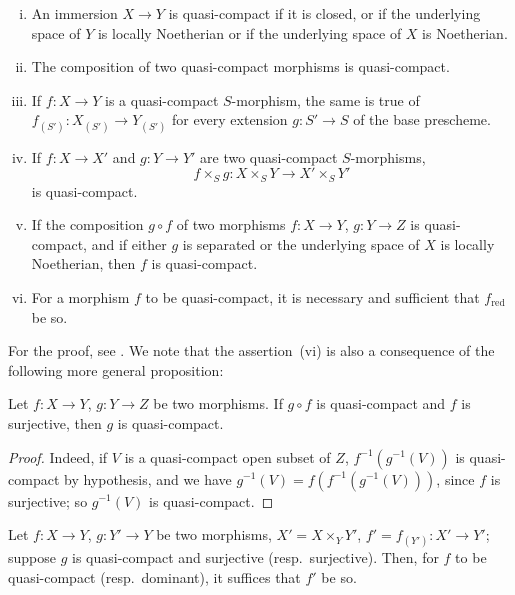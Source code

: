 \begin{proposition}[1.1.2]
\label{IV.1.1.2}
\medskip\noindent
\begin{enumerate}[(i)]
  \item An immersion $X\to Y$ is quasi-compact if it is closed,
    or if the underlying space of $Y$ is locally Noetherian or if the underlying space of $X$ is Noetherian.
  \item The composition of two quasi-compact morphisms is quasi-compact.
  \item If $f:X\to Y$ is a quasi-compact $S$-morphism, the same is true of $f_{(S')}:X_{(S')}\to Y_{(S')}$
    for every extension $g:S'\to S$ of the base prescheme.
  \item If $f:X\to X'$ and $g:Y\to Y'$ are two quasi-compact $S$-morphisms,
    \[
      f\times_S g: X\times_S Y \to X'\times_S Y'
    \]
    is quasi-compact.
  \item If the composition $g\circ f$ of two morphisms $f:X\to Y$, $g:Y\to Z$ is quasi-compact, and
    if either $g$ is separated or the underlying space of $X$ is locally Noetherian, then $f$ is quasi-compact.
  \item For a morphism $f$ to be quasi-compact, it is necessary and sufficient that $f_{\mathrm{red}}$ be so.
\end{enumerate}
\end{proposition}

For the proof, see .
We note that the assertion~(vi) is also a
consequence of the following more general proposition:

\begin{proposition}[1.1.3]
\label{IV.1.1.3}
Let $f:X\to Y$, $g:Y\to Z$ be two morphisms. If $g\circ f$ is quasi-compact and $f$ is surjective, then $g$ is quasi-compact.
\end{proposition}

\begin{proof}
Indeed, if $V$ is a quasi-compact open subset of $Z$, $f^{-1}(g^{-1}(V))$ is quasi-compact
by hypothesis, and we have $g^{-1}(V)=f(f^{-1}(g^{-1}(V)))$, since $f$ is surjective; so $g^{-1}(V)$
is quasi-compact.
\end{proof}

\begin{corollary}[1.1.4]
\label{IV.1.1.4}
Let $f:X\to Y$, $g:Y'\to Y$ be two morphisms, $X'=X\times_Y Y'$,
$f'=f_{(Y')}:X'\to Y'$; suppose $g$ is quasi-compact and surjective \textnormal{(}resp.\ surjective\textnormal{)}. Then, for $f$ to be
quasi-compact \textnormal{(}resp.\ dominant\textnormal{)}, it suffices that $f'$ be so.
\end{corollary}

